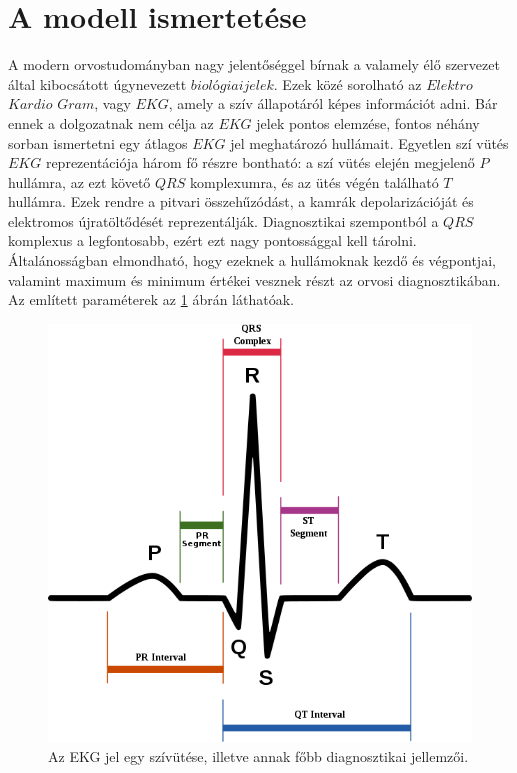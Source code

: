\documentclass[oneside,titlepage,12pt,a4paper]{report}
\begin{document}
\section{A modell ismertetése}
A modern orvostudományban nagy jelentőséggel bírnak 
a valamely élő szervezet által kibocsátott úgynevezett $biológiai jelek$. Ezek közé sorolható az $Elektro$ $Kardio$ $Gram$, vagy $EKG$,
amely a szív állapotáról képes információt adni. Bár ennek a dolgozatnak nem célja az $EKG$ jelek pontos elemzése, fontos néhány sorban ismertetni egy átlagos $EKG$ jel meghatározó hullámait. Egyetlen szí vütés  $EKG$ reprezentációja három fő részre bontható: a szí vütés elején megjelenő $P$ hullámra, az ezt követő $QRS$ komplexumra, és az ütés végén található $T$ hullámra. Ezek rendre a pitvari összehűzódást, a kamrák depolarizációját és elektromos újratöltődését reprezentálják. Diagnosztikai szempontból a $QRS$ komplexus a legfontosabb, ezért ezt nagy pontossággal kell tárolni. Általánosságban elmondható, hogy ezeknek a hullámoknak kezdő és végpontjai, valamint maximum és minimum értékei vesznek részt az orvosi diagnosztikában. Az említett paraméterek az \ref{fig:ekg} ábrán láthatóak.

\begin{figure}[htb!]
\begin{center}
   \includegraphics[scale=0.37]{./Abrak/Egyeb/ecg_wiki.png}
   \caption{Az EKG jel egy szívütése, illetve annak főbb diagnosztikai jellemzői.}
		\label{fig:ekg}
\end{center}
\end{figure}
 
\end{document}
